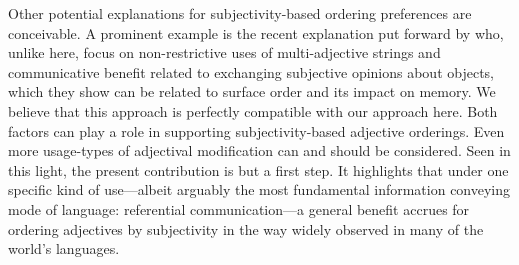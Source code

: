 \documentclass[10pt,a4paper]{article}
\begin{document}
Other potential explanations for subjectivity-based ordering preferences are conceivable. A prominent example is the recent explanation put forward by  who, unlike here, focus on non-restrictive uses of multi-adjective strings and communicative benefit related to exchanging subjective opinions about objects, which they   show can be related to surface order and its impact on memory. We believe that this approach is perfectly compatible with our approach here. Both factors can play a role in supporting subjectivity-based adjective orderings. Even more usage-types of adjectival modification can and should be considered. Seen in this light, the present contribution is but a first step. It highlights that under one specific kind of use---albeit arguably the most fundamental information conveying mode of language: referential communication---a general benefit accrues for ordering adjectives by subjectivity in the way widely observed in many of the world's languages.








\setlength{\bibleftmargin}{.125in}
\setlength{\bibindent}{-\bibleftmargin}


\end{document}
